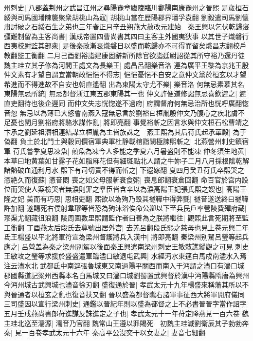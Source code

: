 州刺史|{
	八郡蓋荆州之武昌江州之尋陽豫章廬陵臨川鄱陽南康豫州之晉熙}
是歲桓石綏與司馬國璠陳襲聚衆胡桃山為寇|{
	胡桃山當在歷陽郡界璠孚袁翻}
劉毅遣司馬劉懷肅討破之石綏石生之弟也三年春正月辛丑朔燕大赦改元建始　秦王興以乞伏乾歸寖彊難制留為主客尚書|{
	漢成帝置四曹尚書其四曰主客主外國夷狄事}
以其世子熾磐行西夷校尉監其部衆|{
	是後秦政漸衰熾磐日以盛而乾歸亦不可得而留矣熾昌志翻校戶教翻監工衡翻}
二月己酉劉裕詣建康固辭新所除官欲詣廷尉詔從其所守裕乃還丹徒　魏主珪立其子修為河間王處文為長樂王|{
	處昌呂翻樂音洛}
連為廣平王黎為京兆王殷仲文素有才望自謂宜當朝政悒悒不得志|{
	悒悒憂悒不自安之意仲文黨於桓玄以才望希進而不得進故不自安也朝直遙翻}
出為東陽太守尤不樂|{
	樂音洛}
何無忌素慕其名東陽無忌所統|{
	無忌都督浙江東五郡東陽其一也}
仲文許便道修謁無忌喜欽遲之|{
	遲直吏翻待也後企遲同}
而仲文失志恍惚遂不過府|{
	府謂督府何無忌治所也恍呼廣翻惚音忽}
無忌以為薄已大怒會南燕入寇無忌言於劉裕曰桓胤殷仲文乃腹心之疾北虜不足憂也閏月劉裕府將駱氷謀作亂|{
	將即亮翻}
事覺裕斬之因言氷與仲文桓石松曹靖之卞承之劉延祖潛相連結謀立桓胤為主皆族誅之　燕王熙為其后苻氏起承華殿|{
	為于偽翻}
負土於北門土與穀同價宿軍典軍杜静載棺詣闕極諫熙斬之|{
	北燕營州刺史鎮宿軍}
苻氏嘗季夏思凍魚|{
	煎魚為凍今人多能之季夏六月暑盛則不能凍}
仲冬須生地黄|{
	本草曰地黄葉如甘露子花如脂麻花但有細斑點北人謂之牛妳子二月八月採根隂乾解諸熱破血通利月水}
熙下有司切責不得而斬之|{
	下遐嫁翻}
夏四月癸丑苻氏卒熙哭之懣絶久而復蘇|{
	懣音悶}
喪之如父母服斬衰食粥|{
	喪息郎翻衰倉回翻}
命百官於宫内設位而哭使人案檢哭者無淚則罪之羣臣皆含辛以為淚高陽王妃張氏熙之嫂也|{
	高陽王隆之妃}
美而有巧思|{
	思相吏翻}
熙欲以為殉乃毁其禭鞾中得弊氈|{
	禭音遂送終曰禭鞾許加翻}
遂賜死右僕射韋璆等皆恐為殉沐浴俟命公卿以下至兵民戶率營陵費殫府藏|{
	璆渠尤翻藏徂浪翻}
陵周圍數里熙謂監作者曰善為之朕將繼往|{
	觀熙此言死期將至監工銜翻}
丁酉燕太后段氏去尊號出居外宫|{
	去羌呂翻段氏熙之慈母也見上卷元興二年}
氐王楊盛以平北將軍符宣為梁州督護將兵入漢中|{
	將即亮翻}
秦梁州别駕呂瑩等起兵應之|{
	呂營盖為秦之梁州别駕以後面秦王興遣南梁州刺史王敏敕譙縱觀之可見}
刺史王敏攻之瑩等求援於盛盛遣軍臨濜口敏退屯武興|{
	水經沔水東逕白馬戍南濜水入焉注云濜水北武都氐中南逕張魯城東又南過陽平關西而南入于沔謂之濜口有濜口城郡國縣道記梁州西縣本名白馬城又曰濜口城劉蜀置武興督於漢中沔陽縣隋唐為興州今沔州城古武興城也濜音徐刃翻}
盛復通於晉|{
	孝武太元十九年楊盛來稱藩其所以不與晉通者以桓玄之亂也復音扶又翻}
晉以盛為都督隴右諸軍事征西大將軍開府儀同三司盛因以宣行梁州刺史|{
	通鑑以晉紀年則以盛為都督之上不必書晉晉字當作詔字}
五月壬戌燕尚書郎苻進謀反誅進定之子也|{
	孝武太元十一年苻定降燕見一百六卷}
魏主珪北巡至濡源|{
	濡音乃官翻}
魏常山王遵以罪賜死　初魏主珪滅劉衛辰其子勃勃奔秦|{
	見一百卷孝武太元十六年}
秦高平公沒奕干以女妻之|{
	妻音七細翻}
